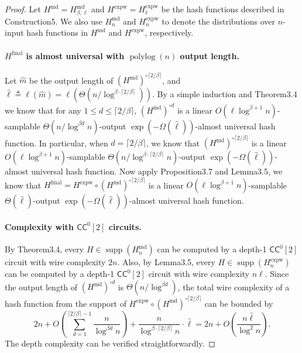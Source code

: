 \begin{proof}
Let $H^{\mathrm{md}}=H^{\mathrm{md}}_{\beta,\ell}$ and $H^{\mathrm{expw}}=H^{\mathrm{expw}}_\ell$ be the hash functions described in Construction5. We also use $H_n^{\mathrm{md}}$ and $H_n^{\mathrm{expw}}$ to denote the distributions over $n$-input hash functions in $H^{\mathrm{md}}$ and $H^{\mathrm{expw}}$, respectively.
\paragraph{$H^{\mathrm{final}}$ is almost universal with $\operatorname{polylog}(n)$ output length.}
Let $\hat m$ be the output length of $(H^{\mathrm{md}})^{\circ\lceil2/\beta\rceil}$, and $\hat\ell\triangleq\ell(\hat m)=\ell(\Theta(n/\log^{\beta\cdot\lceil2/\beta\rceil}))$. By a simple induction and Theorem3.4 we know that for any $1\le d\le\lceil2/\beta\rceil$, $(H^{\mathrm{md}})^{\circ d}$ is a linear $O(\ell\log^{\beta+1}n)$-samplable $\Theta(n/\log^{\beta d}n)$-output $\exp(-\Omega(\hat\ell))$-almost universal hash function. In particular, when $d=\lceil2/\beta\rceil$, we know that $(H^{\mathrm{md}})^{\circ\lceil2/\beta\rceil}$ is a linear $O(\ell\log^{\beta+1}n)$-samplable $\Theta(n/\log^{\beta\cdot\lceil2/\beta\rceil}n)$-output $\exp(-\Omega(\hat\ell))$-almost universal hash function.
Now apply Proposition3.7 and Lemma3.5, we know that $H^{\mathrm{final}}=H^{\mathrm{expw}}\circ(H^{\mathrm{md}})^{\circ\lceil2/\beta\rceil}$ is a linear $O(\ell\log^{\beta+1}n)$-samplable $\Theta(\hat\ell)$-output $\exp(-\Omega(\hat\ell))$-almost universal hash function.
\paragraph{Complexity with $\mathsf{CC}^0[2]$ circuits.}
By Theorem3.4, every $H\in\operatorname{supp}(H_n^{\mathrm{md}})$ can be computed by a depth-1 $\mathsf{CC}^0[2]$ circuit with wire complexity $2n$. Also, by Lemma3.5, every $H\in\operatorname{supp}(H_n^{\mathrm{expw}})$ can be computed by a depth-1 $\mathsf{CC}^0[2]$ circuit with wire complexity $n\ell$. Since the output length of $(H^{\mathrm{md}})^{\circ d}$ is $\Theta(n/\log^{\beta d})$, the total wire complexity of a hash function from the support of $H^{\mathrm{expw}}\circ(H^{\mathrm{md}})^{\circ\lceil2/\beta\rceil}$ can be bounded by
\[2n+O\left(\sum_{d=1}^{\lceil2/\beta\rceil-1}\frac n{\log^{\beta d}n}\right)+\frac n{\log^{\beta\cdot\lceil2/\beta\rceil}n}\cdot\hat\ell=2n+O\left(\frac{n\hat\ell}{\log^2n}\right).\]
The depth complexity can be verified straightforwardly.

\end{proof}
